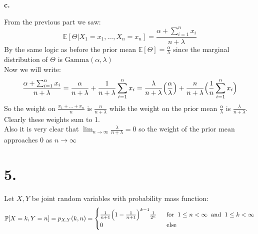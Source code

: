 \documentclass{article}
\begin{document}
\newpage
{\Large\textbf{c.}}
\begin{center}
\doublespacing
    From the previous part we saw:
    \[\mathbb{E}[\Theta | X_1 = x_1, ..., X_n = x_n] =\frac{\alpha +\sum_{i=1}^n x_i}{n +\lambda}\]
    By the same logic as before the prior mean $\mathbb{E}[\Theta] =\frac{\alpha}{\lambda}$ since the marginal distribution of $\Theta$ is $\mbox{Gamma}(\alpha,\lambda)$
    \\Now we will write:
    \[\frac{\alpha +\sum_{i=1}^n x_i}{n +\lambda} =\frac{\alpha}{n +\lambda} +\frac{1}{n +\lambda}\sum_{i=1}^n x_i =\frac{\lambda}{n +\lambda}\Big{(}\frac{\alpha}{\lambda}\Big{)} +\frac{n}{n +\lambda}\Big{(}\frac{1}{n}\sum_{i=1}^n x_i\Big{)}\]
    So the weight on $\frac{x_1 + ... + x_n}{n}$ is $\frac{n}{n +\lambda}$ while the weight on the prior mean $\frac{\alpha}{\lambda}$ is $\frac{\lambda}{n +\lambda}$. Clearly these weights sum to 1.
    \\Also it is very clear that $\lim_{n\rightarrow\infty}\frac{\lambda}{n +\lambda} = 0$ so the weight of the prior mean approaches 0 as $n\rightarrow\infty$ \qedsymbol
\end{center}


\newpage
\section*{5.}
\begin{center}
\doublespacing
    Let $X, Y$ be joint random variables with probability mass function:
    \[\mathbb{P}[X = k, Y = n] = p_{X, Y} (k, n) =
    \begin{cases}
        \frac{1}{n+1}\Big{(}1 -\frac{1}{n+1}\Big{)}^{k-1}\frac{1}{2^n} &\;\;\mbox{for}\;\;1\leq n <\infty\;\;\mbox{and}\;\;1\leq k <\infty \\
        0 & \;\;\mbox{else}
    \end{cases}
    \]
\end{center}
\end{document}
